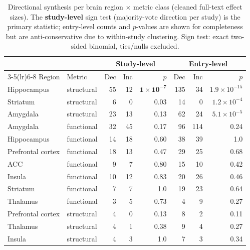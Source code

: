 \documentclass[11pt]{article}
\begin{document}
\begin{table}[t]
\centering
\caption{Directional synthesis per brain region $\times$ metric class (cleaned
full-text effect sizes). The \textbf{study-level} sign test (majority-vote
direction per study) is the primary statistic; entry-level counts and $p$-values
are shown for completeness but are anti-conservative due to within-study
clustering. Sign test: exact two-sided binomial, ties/nulls excluded.}
\label{tab:dir}
\begin{tabular}{llrrr@{\hskip 12pt}rrr}
\toprule
 & & \multicolumn{3}{c}{Study-level} & \multicolumn{3}{c}{Entry-level} \\
\cmidrule(lr){3-5}\cmidrule(lr){6-8}
Region & Metric & Dec & Inc & $p$ & Dec & Inc & $p$ \\
\midrule
Hippocampus & structural & 55 & 12 & $\mathbf{1\times10^{-7}}$ & 135 & 34 & $1.9\times10^{-15}$ \\
Striatum & structural & 6 & 0 & $\mathbf{0.03}$ & 14 & 0 & $1.2\times10^{-4}$ \\
Amygdala & structural & 23 & 13 & 0.13 & 62 & 24 & $5.1\times10^{-5}$ \\
Amygdala & functional & 32 & 45 & 0.17 & 96 & 114 & 0.24 \\
Hippocampus & functional & 14 & 18 & 0.60 & 38 & 39 & 1.0 \\
Prefrontal cortex & functional & 18 & 13 & 0.47 & 29 & 25 & 0.68 \\
ACC & functional & 9 & 7 & 0.80 & 15 & 10 & 0.42 \\
Insula & functional & 10 & 12 & 0.83 & 20 & 26 & 0.46 \\
Striatum & functional & 7 & 7 & 1.0 & 19 & 23 & 0.64 \\
Thalamus & functional & 3 & 5 & 0.73 & 4 & 9 & 0.27 \\
Prefrontal cortex & structural & 4 & 0 & 0.13 & 8 & 2 & 0.11 \\
Thalamus & structural & 4 & 1 & 0.38 & 9 & 4 & 0.27 \\
Insula & structural & 4 & 3 & 1.0 & 7 & 3 & 0.34 \\
\bottomrule
\end{tabular}
\end{table}
\end{document}
